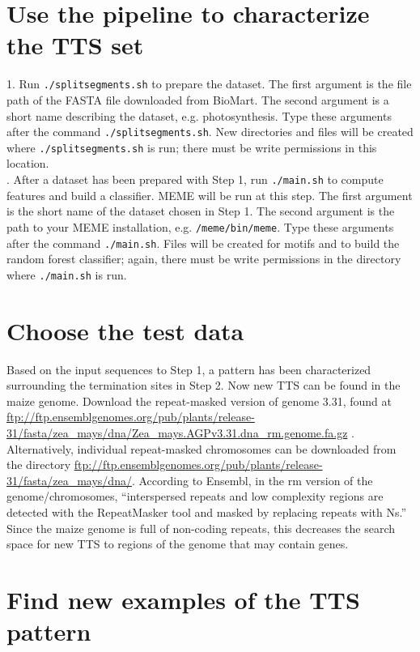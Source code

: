 \documentclass[12pt,letterpaper]{report}
\begin{document}
\section*{Use the pipeline to characterize the TTS set}
1. \indent Run \texttt{./splitsegments.sh} to prepare the dataset. The first argument is the file path of the FASTA file downloaded from BioMart. The second argument is a short name describing the dataset, e.g. photosynthesis. Type these arguments after the command \texttt{./splitsegments.sh}. New directories and files will be created where \texttt{./splitsegments.sh} is run; there must be write permissions in this location.\\

. \indent After a dataset has been prepared with Step 1, run \texttt{./main.sh} to compute features and build a classifier. MEME will be run at this step. The first argument is the short name of the dataset chosen in Step 1. The second argument is the path to your MEME installation, e.g. \texttt{/meme/bin/meme}. Type these arguments after the command \texttt{./main.sh}. Files will be created for motifs and to build the random forest classifier; again, there must be write permissions in the directory where \texttt{./main.sh} is run. 

\section*{Choose the test data}
\indent Based on the input sequences to Step 1, a pattern has been characterized surrounding the termination sites in Step 2. Now new TTS can be found in the maize genome. Download the repeat-masked version of genome 3.31, found at \url{ftp://ftp.ensemblgenomes.org/pub/plants/release-31/fasta/zea_mays/dna/Zea_mays.AGPv3.31.dna_rm.genome.fa.gz} \cite{maize}. Alternatively, individual repeat-masked chromosomes can be downloaded from the directory \url{ftp://ftp.ensemblgenomes.org/pub/plants/release-31/fasta/zea_mays/dna/}. According to Ensembl, in the rm version of the genome/chromosomes, ``interspersed repeats and low complexity regions are detected with the RepeatMasker tool and masked by replacing repeats with Ns.'' Since the maize genome is full of non-coding repeats, this decreases the search space for new TTS to regions of the genome that may contain genes.

\section*{Find new examples of the TTS pattern}
\end{document}
